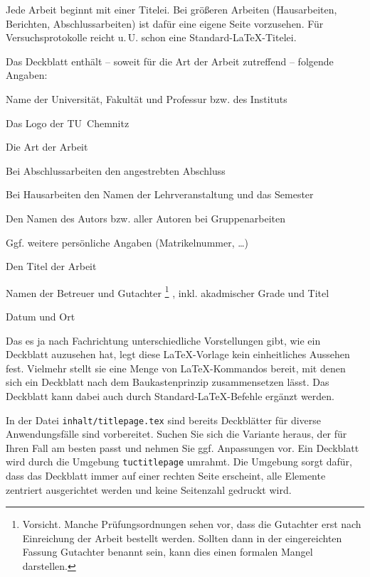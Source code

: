 Jede Arbeit beginnt mit einer Titelei. Bei größeren Arbeiten
(Hausarbeiten, Berichten, Abschlussarbeiten) ist dafür eine eigene Seite
vorzusehen. Für Versuchsprotokolle reicht u.\,U. schon eine
Standard-\LaTeX-Titelei.

Das Deckblatt enthält -- soweit für die Art der Arbeit zutreffend --
folgende Angaben:

\begin{compactitem}
\item Name der Universität, Fakultät und Professur bzw. des Instituts
\item Das Logo der TU~Chemnitz
\item Die Art der Arbeit
\item Bei Abschlussarbeiten den angestrebten Abschluss
\item Bei Hausarbeiten den Namen der Lehrveranstaltung und das Semester
\item Den Namen des Autors bzw. aller Autoren bei Gruppenarbeiten
\item Ggf. weitere persönliche Angaben (Matrikelnummer, \dots)
\item Den Titel der Arbeit
\item Namen der Betreuer und Gutachter%
      \footnote{Vorsicht. Manche Prüfungsordnungen sehen vor, dass die
                Gutachter erst nach Einreichung der Arbeit bestellt werden.
		Sollten dann in der eingereichten Fassung Gutachter benannt
		sein, kann dies einen formalen Mangel darstellen.}%
      , inkl. akadmischer Grade und Titel
\item Datum und Ort
\end{compactitem}

Das es ja nach Fachrichtung unterschiedliche Vorstellungen gibt, wie ein
Deckblatt auzusehen hat, legt diese \LaTeX-Vorlage kein einheitliches Aussehen
fest. Vielmehr stellt sie eine Menge von \LaTeX-Kommandos bereit, mit denen
sich ein Deckblatt nach dem Baukastenprinzip zusammensetzen lässt. Das
Deckblatt kann dabei auch durch Standard-\LaTeX-Befehle ergänzt werden.

In der Datei \texttt{inhalt/titlepage.tex} sind bereits Deckblätter für diverse
Anwendungsfälle sind vorbereitet. Suchen Sie sich die Variante heraus, der
für Ihren Fall am besten passt und nehmen Sie ggf. Anpassungen vor. Ein
Deckblatt wird durch die Umgebung \texttt{tuctitlepage} umrahmt. Die Umgebung
sorgt dafür, dass das Deckblatt immer auf einer rechten Seite erscheint, alle
Elemente zentriert ausgerichtet werden und keine Seitenzahl gedruckt wird.

